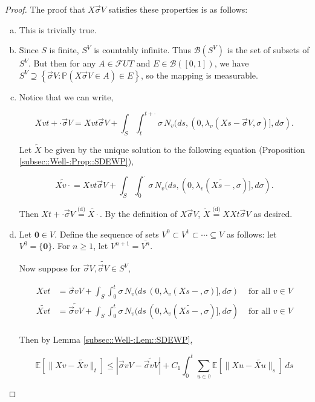 \documentclass[12pt]{article}
\newcommand{\mb}{\mathbb}
\newcommand{\mc}{\mathcal}
\newcommand{\ms}{\mathscr}
\newcommand{\ov}{\overline}
\newcommand{\te}{\text}
\newcommand{\ind}{\hspace{24pt}}
\newcommand{\pr}{\mb{P}}							%
\newcommand{\ex}[1]{\mb{E}\left[#1\right]}			%
\newcommand{\deq}{\overset{\text{(d)}}{=}}			%
\renewcommand{\root}{\mathbf{0}}				%
\renewcommand{\v}{v}							%
\newcommand{\vv}{u}								%
\renewcommand{\U}{U}							%
\renewcommand{\S}{S}							%
\newcommand{\s}{\sigma}							%
\newcommand{\sv}{\vec{\s}}						%
\newcommand{\T}{T}								%
\renewcommand{\t}{t}							%
\renewcommand{\tt}{s}							%
\newcommand{\F}{\mc{F}}							%
\newcommand{\X}{X}								%
\newcommand{\cl}{\ov}							%
\newcommand{\poiss}[1]{N_{#1}}						%
\newcommand{\pup}[1]{^{#1}}							%
\newcommand{\numb}{n}								%
\newcommand{\XState}[1]{\S^{#1}}				%
\newcommand{\rate}[1]{\lambda_{#1}}					%
\newcommand{\const}[1]{C_{#1}}						%
\newcommand{\alt}{\widetilde}						%
\begin{document}
\begin{proof}
The proof that \(\X{}{}{\sv{}{ V}}\) satisfies these properties is as follows:

\begin{enumerate}[(a)]
\item This is trivially true.

\item Since \(\S\) is finite, \(\S^ V\) is countably infinite. Thus \(\ms{B}(\S^ V)\) is the set of subsets of \(\S^ V\). But then for any \(A \in \F{\U}{\T}\) and \(E \in \ms{B}([0,1])\), we have \(\S^ V \supseteq \left\{\sv{}{ V}: \pr\left(\X{}{}{\sv{}{ V}} \in A\right) \in E\right\}\), so the mapping is measurable.

\item Notice that we can write,

\[\X{\v}{\t+\cdot}{\sv{}{ V}} = \X{\v}{\t}{\sv{}{ V}} + \int_\S\int_\t^{\t+\cdot} \s\,\poiss{\v}(d\tt,(0,\rate{\v}(\X{}{\tt-}{\sv{}{ V}},\s)],d\s).\]

Let \(\alt{\X{}{}}\) be given by the unique solution to the following equation (Proposition \ref{subsec::Well-:Prop::SDEWP}),

\[\alt{\X{\v}{\cdot}} = \X{\v}{\t}{\sv{}{ V}} + \int_\S \int_0^\cdot \s\,\poiss{\v}(d\tt,(0,\rate{\v}(\alt{\X{}{\tt-}},\s)],d\s).\]

Then \(\X{}{\t+\cdot}{\sv{}{ V}} \deq \alt{\X{}{\cdot}}\). By the definition of \(\X{}{}{\sv{}{ V}}\), \(\alt{\X{}{}} \deq \X{}{}{\X{}{\t}{\sv{}{ V}}}\) as desired.

\item Let \(\root \in  V\). Define the sequence of sets \( V\pup{0}\subset  V\pup{1}\subset \cdots \subseteq  V\) as follows: let \( V\pup{0} = \{\root\}\). For \(\numb \geq 1\), let \( V\pup{\numb+1} = \cl{ V\pup{\numb}}\).

\ind Now suppose for \(\sv{}{ V},\alt{\sv{}{ V}}\in \S^ V\),

\begin{align*}
\X{\v}{\t} &= \sv{\v}{ V} + \int_\S\int_0^\t \s\,\poiss{\v}(d\tt\,(0,\rate{\v}(\X{}{\tt-},\s)],d\s)&\te{ for all } \v \in  V\\
\alt{\X{\v}{\t}} &= \alt{\sv{\v}{ V}} + \int_\S\int_0^\t \s\,\poiss{\v}(d\tt\,(0,\rate{\v}(\alt{\X{}{\tt-}},\s)],d\s)&\te{ for all } \v \in  V\\
\end{align*}

Then by Lemma \ref{subsec::Well-:Lem::SDEWP},

\[\ex{\|\X{\v}{} - \alt{\X{\v}{}}\|_\t} \leq |\sv{\v}{ V} - \alt{\sv{\v}{ V}}| + \const{1}\int_0^\t \sum_{\vv\in \cl{\v}} \ex{\|\X{\vv}{} - \alt{\X{\vv}{}}\|_\tt}\,d\tt\]


\end{enumerate}
\end{proof}
\end{document}
